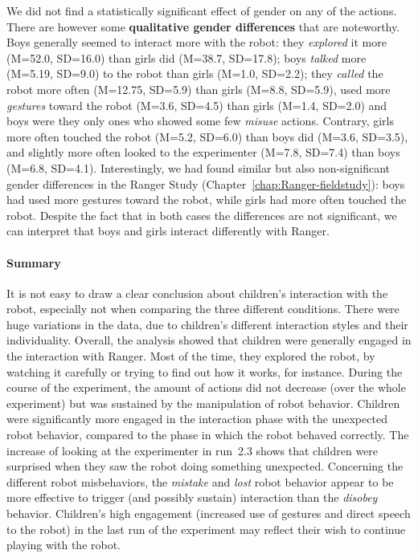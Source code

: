 \documentclass{sig-alternate}
\begin{document}
We did not find a statistically significant effect of gender on any of the
actions. There are however some \textbf{qualitative gender differences} that are
noteworthy. Boys generally seemed to interact more with the robot: they
\textit{explored} it more (M=52.0, SD=16.0) than girls did (M=38.7, SD=17.8);
boys \textit{talked} more (M=5.19, SD=9.0) to the robot than girls (M=1.0,
SD=2.2); they \textit{called} the robot more often (M=12.75, SD=5.9) than girls
(M=8.8, SD=5.9), used more \textit{gestures} toward the robot (M=3.6, SD=4.5)
than girls (M=1.4, SD=2.0) and boys were they only ones who showed some few
\textit{misuse} actions. Contrary, girls more often touched the robot (M=5.2,
SD=6.0) than boys did (M=3.6, SD=3.5), and slightly more often looked to the
experimenter (M=7.8, SD=7.4) than boys (M=6.8, SD=4.1). Interestingly, we had
found similar but also non-significant gender differences in the Ranger Study
(Chapter~\ref{chap:Ranger-fieldstudy}): boys had used more gestures toward the
robot, while girls had more often touched the robot. Despite the fact that in
both cases the differences are not significant, we can interpret that boys and
girls interact differently with Ranger.


\paragraph{Summary}	

It is not easy to draw a clear conclusion about children's interaction with the
robot, especially not when comparing the three different conditions. There were
huge variations in the data, due to children's different interaction styles and
their individuality. Overall, the analysis showed that children were generally
engaged in the interaction with Ranger. Most of the time, they explored the
robot, by watching it carefully or trying to find out how it works, for
instance. During the course of the experiment, the amount of actions did not
decrease (over the whole experiment) but was sustained by the manipulation of
robot behavior. Children were significantly more engaged in the interaction
phase with the unexpected robot behavior, compared to the phase in which the
robot behaved correctly. The increase of looking at the experimenter in run~2.3
shows that children were surprised when they saw the robot doing something
unexpected. Concerning the different robot misbehaviors, the \textit{mistake}
and \textit{lost} robot behavior appear to be more effective to trigger (and
possibly sustain) interaction than the \textit{disobey} behavior. Children's
high engagement (increased use of gestures and direct speech to the robot) in
the last run of the experiment may reflect their wish to continue playing with
the robot.
\end{document}
